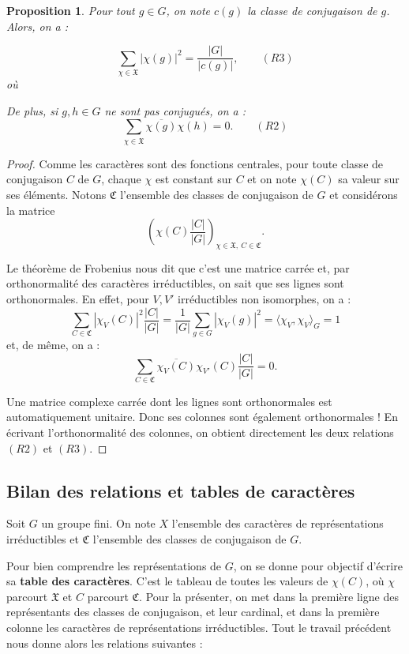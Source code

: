 \documentclass[a4paper]{article}
\theoremstyle{definition} %
\theoremstyle{plain} %
\newtheorem{Prop}[Def]{Proposition} %
\theoremstyle{remark} %
\begin{document}
\begin{Prop}
	Pour tout $g \in G$, on note $c(g)$ la classe de conjugaison de $g$. Alors, on a :
	
	$$\sum_{\chi \in \mathfrak{X}} |\chi(g)|^2 = \frac{|G|}{|c(g)|}, \qquad (R3)$$
	où 
	
	De plus, si $g,h \in G$ ne sont pas conjugués, on a :
	$$\sum_{\chi \in \mathfrak{X}} \overline{\chi(g)} \chi(h) = 0. \qquad (R2)$$
\end{Prop}

\begin{proof}
	 Comme les caractères sont des fonctions centrales, pour toute classe de conjugaison $C$ de $G$, chaque $\chi$ est constant sur $C$ et on note $\chi(C)$ sa valeur sur ses éléments. Notons $\mathfrak{C}$ l'ensemble des classes de conjugaison de $G$ et considérons la matrice 
	 \[
	 \left( \chi(C) \frac{|C|}{|G|}\right)_{\chi \in \mathfrak{X},\ C \in \mathfrak{C}}.
	 \]
	 
	 Le théorème de Frobenius nous dit que c'est une matrice carrée et, par orthonormalité des caractères irréductibles, on sait que ses lignes sont orthonormales. En effet, pour $V,V'$ irréductibles non isomorphes, on a :
	 \[
	 \sum_{C \in \mathfrak{C}} |\chi_V(C)|^2 \frac{|C|}{|G|} = \frac{1}{|G|} \sum_{g \in G} |\chi_V(g)|^2 = \langle \chi_V,\chi_V \rangle_G = 1
	 \]
	 et, de même, on a :
	 \[
	 \sum_{C \in \mathfrak{C}} \overline{\chi_V(C)} \chi_{V'}(C) \frac{|C|}{|G|} = 0.
	 \]
	 
	 Une matrice complexe carrée dont les lignes sont orthonormales est automatiquement unitaire.
	 Donc ses colonnes sont également orthonormales ! En écrivant l'orthonormalité des colonnes, on obtient directement les deux relations $(R2)$ et $(R3)$.
\end{proof}


\subsection{Bilan des relations et tables de caractères}

Soit $G$ un groupe fini. On note $X$ l'ensemble des caractères de représentations irréductibles et $\mathfrak{C}$ l'ensemble des classes de conjugaison de $G$. 

Pour bien comprendre les représentations de $G$, on se donne pour objectif d'écrire sa {\bf table des caractères}. C'est le tableau de toutes les valeurs de $\chi(C)$, où $\chi$ parcourt $\mathfrak{X}$ et $C$ parcourt $\mathfrak{C}$. Pour la présenter, on met dans la première ligne des représentants des classes de conjugaison, et leur cardinal, et dans la première colonne les caractères de représentations irréductibles. Tout le travail précédent nous donne alors les relations suivantes : 
\end{document}
